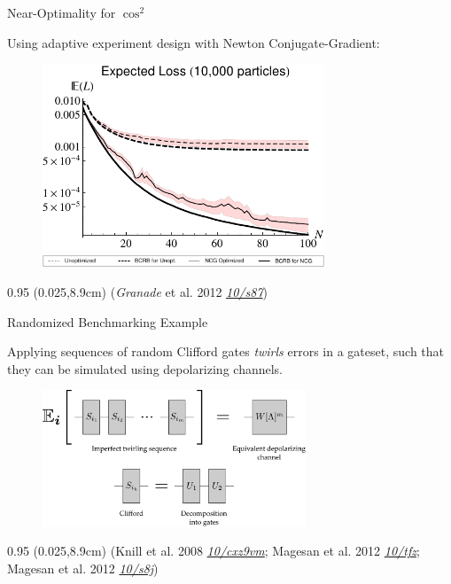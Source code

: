 \documentclass[xcolor=dvipsnames, compress]{beamer}
\renewcommand\UrlFont{\color{red}\rmfamily\itshape}
\newcommand{\shortdoi}[1]{\href{http://doi.org/#1}{\UrlFont 10/#1}}
\newcommand{\bottomnote}[1]{
  \begin{textblock*}{0.95\paperwidth} (0.025\paperwidth,8.9cm)
    {\tiny \hfill #1}
  \end{textblock*}
}
\begin{document}
\begin{frame}{Near-Optimality for $\cos^2$}

  Using adaptive experiment design with Newton Conjugate-Gradient:

  \begin{figure}
    \centering
    \includegraphics[width=0.75\textwidth]{knownT2-10000-particles-mse} \\
    \includegraphics[width=0.75\textwidth]{knownT2-n-particles-mse-legend}
  \end{figure}

  \bottomnote{(\emph{Granade} et al. 2012 \shortdoi{s87})}

\end{frame}

\begin{frame}{Randomized Benchmarking Example}

  Applying sequences of random Clifford gates \emph{twirls}
  errors in a gateset, such that they can be simulated
  using depolarizing channels.

  \begin{figure}
    \centering
    \includegraphics[width=0.7\textwidth]{benchmarking-overview}
  \end{figure}

  \bottomnote{(Knill et al. 2008 \shortdoi{cxz9vm}; Magesan et al. 2012 \shortdoi{tfz}; Magesan et al. 2012 \shortdoi{s8j})}

\end{frame}
\end{document}
